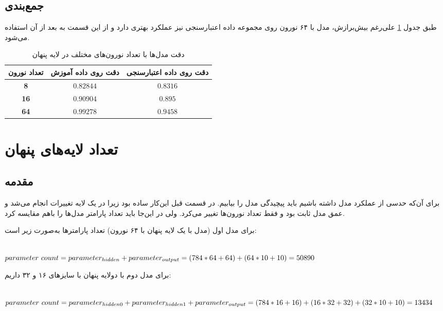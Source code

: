 \subsection{جمع‌بندی}
طبق جدول 
\ref{tab:neuron_count}
 علی‌رغم بیش‌برازش، مدل با ۶۴ نورون روی مجموعه داده اعتبارسنجی نیز عملکرد بهتری دارد و از این قسمت به بعد از آن استفاده می‌شود.

\begin{table}[h!]
	\begin{center}
		\caption{دقت مدل‌ها با تعداد نورون‌های مختلف در لایه پنهان}
		\label{tab:neuron_count}
		\begin{tabular}{c|c|c}
			تعداد نورون & دقت  روی داده آموزش & دقت روی داده اعتبارسنجی \\
			\hline
			\textbf{ 8} & $0.82844$ & $0.8316$  \\
			\textbf{16} & $0.90904$  & $0.895$ \\
			\textbf{64}&  $0.99278$ & $0.9458$
		\end{tabular}
	\end{center}
\end{table}

\section{تعداد لایه‌های پنهان}
\subsection{مقدمه}
برای آن‌که حدسی از عملکرد مدل داشته باشیم باید پیچیدگی مدل را بیابیم. در قسمت قبل این‌کار ساده بود زیرا در یک لایه تغییرات انجام می‌شد و عمق مدل ثابت بود و فقط تعداد نورون‌ها تغییر می‌کرد. ولی در این‌جا باید تعداد پارامتر مدل‌ها را باهم مقایسه کرد.

برای مدل اول (مدل با یک لایه پنهان با ۶۴ نورون) تعداد پارامتر‌ها به‌صورت زیر است:

\begin{latin}
	~\\
	$
	parameter\ count = parameter_{hidden} + parameter_{output}
	\\
	= 
	(784 * 64 + 64) + (64 * 10 + 10)
	= 
	50890 
	$
\end{latin}

برای مدل دوم با دولایه پنهان با سایزهای ۱۶ و ۳۲ داریم:

\begin{latin}
	~\\
	$
	parameter\ count = parameter_{hidden0} + parameter_{hidden1} + parameter_{output}
	\\
	=
	(784 * 16 + 16) + (16 * 32 + 32) + (32 * 10 + 10)
	= 
	13434 
	$
\end{latin}

